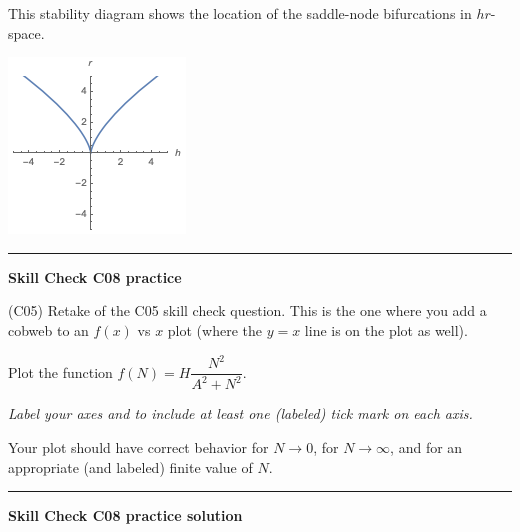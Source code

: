 \documentclass[12pt,letterpaper,noanswers]{exam}
\begin{document}
This stability diagram shows the location of the saddle-node bifurcations in $hr$-space.

\includegraphics{img/C08stability.png}


\vspace{0.2cm}
\hrule
\vspace{0.2cm}


\noindent\textbf{Skill Check C08 practice}
\begin{questions}
\item (C05) Retake of the C05 skill check question.  This is the one where you add a cobweb to an $f(x)$ vs $x$ plot (where the $y = x$ line is on the plot as well).

\item 
Plot the function $f(N) = H\dfrac{N^2}{A^2+N^2}$.  

\emph{Label your axes and to include at least one (labeled) tick mark on each axis.}

Your plot should have correct behavior for $N\rightarrow 0$, for $N\rightarrow\infty$, and for an appropriate (and labeled) finite value of $N$.

\end{questions}




\vspace{0.2cm}

\hrule
\vspace{0.2cm}

\noindent\textbf{Skill Check C08 practice solution}
\end{document}
